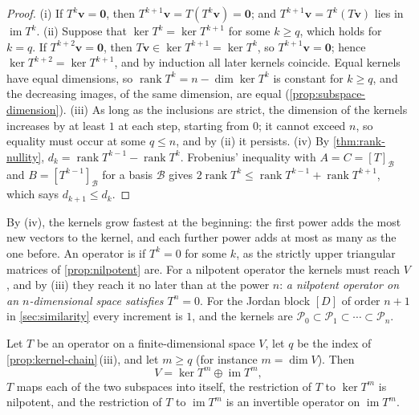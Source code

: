 \begin{proof}
(i) If $T^k\mathbf v=\mathbf 0$, then $T^{k+1}\mathbf v=T(T^k\mathbf v)=\mathbf 0$; and $T^{k+1}\mathbf v=T^k(T\mathbf v)$ lies in $\operatorname{im}T^k$. (ii) Suppose that $\ker T^k=\ker T^{k+1}$ for some $k\ge q$, which holds for $k=q$. If $T^{k+2}\mathbf v=\mathbf 0$, then $T\mathbf v\in\ker T^{k+1}=\ker T^k$, so $T^{k+1}\mathbf v=\mathbf 0$; hence $\ker T^{k+2}=\ker T^{k+1}$, and by induction all later kernels coincide. Equal kernels have equal dimensions, so $\operatorname{rank}T^k=n-\dim\ker T^k$ is constant for $k\ge q$, and the decreasing images, of the same dimension, are equal (\cref{prop:subspace-dimension}). (iii) As long as the inclusions are strict, the dimension of the kernels increases by at least $1$ at each step, starting from $0$; it cannot exceed $n$, so equality must occur at some $q\le n$, and by (ii) it persists. (iv) By \cref{thm:rank-nullity}, $d_k=\operatorname{rank}T^{k-1}-\operatorname{rank}T^k$. Frobenius' inequality with $A=C=[T]_{\mathcal B}$ and $B=[T^{k-1}]_{\mathcal B}$ for a basis $\mathcal B$ gives $2\operatorname{rank}T^k\le\operatorname{rank}T^{k-1}+\operatorname{rank}T^{k+1}$, which says $d_{k+1}\le d_k$.
\end{proof}

By (iv), the kernels grow fastest at the beginning: the first power adds the most new vectors to the kernel, and each further power adds at most as many as the one before. An operator is  if $T^k=0$ for some $k$, as the strictly upper triangular matrices of \cref{prop:nilpotent} are. For a nilpotent operator the kernels must reach $V$, and by (iii) they reach it no later than at the power $n$: \emph{a nilpotent operator on an $n$-dimensional space satisfies $T^n=0$}. For the Jordan block $[D]$ of order $n+1$ in \cref{sec:similarity} every increment is $1$, and the kernels are $\mathcal P_0\subset\mathcal P_1\subset\cdots\subset\mathcal P_n$.

\begin{theorem}
\label{thm:fitting}
Let $T$ be an operator on a finite-dimensional space $V$, let $q$ be the index of \cref{prop:kernel-chain}\,(iii), and let $m\ge q$ (for instance $m=\dim V$). Then
\[
V=\ker T^m\oplus\operatorname{im}T^m,
\]
$T$ maps each of the two subspaces into itself, the restriction of $T$ to $\ker T^m$ is nilpotent, and the restriction of $T$ to $\operatorname{im}T^m$ is an invertible operator on $\operatorname{im}T^m$.
\end{theorem}

